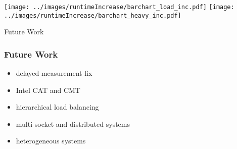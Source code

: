 \documentclass[utf8,10pt]{beamer}
\begin{document}
\begin{frame}
  \frametitle{}
  \centering
    \texttt{[image: ../images/runtimeIncrease/barchart\_load\_inc.pdf]}
    \texttt{[image: ../images/runtimeIncrease/barchart\_heavy\_inc.pdf]}
\end{frame}

\begin{frame}
  \centering
  \Large
  Future Work
\end{frame}

\begin{frame}
  \frametitle{Future Work}
  \centering
  \begin{itemize}
    \item delayed measurement fix
    \item Intel CAT and CMT
    \item hierarchical load balancing
    \item multi-socket and distributed systems
    \item heterogeneous systems
  \end{itemize}
\end{frame}
\end{document}
